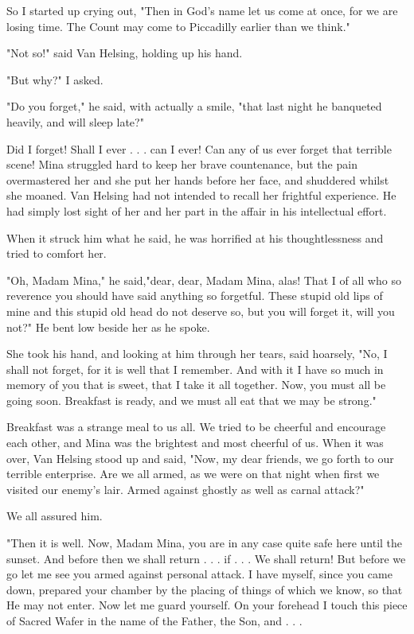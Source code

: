So I started up crying out, "Then in God's name let us come at once, for we are losing time. The Count may come to Piccadilly earlier than we think." 

"Not so!" said Van Helsing, holding up his hand. 

"But why?" I asked. 

"Do you forget," he said, with actually a smile, "that last night he banqueted heavily, and will sleep late?" 

Did I forget! Shall I ever . . . can I ever! Can any of us ever forget that terrible scene! Mina struggled hard to keep her brave countenance, but the pain overmastered her and she put her hands before her face, and shuddered whilst she moaned. Van Helsing had not intended to recall her frightful experience. He had simply lost sight of her and her part in the affair in his intellectual effort. 

When it struck him what he said, he was horrified at his thoughtlessness and tried to comfort her. 

"Oh, Madam Mina," he said,"dear, dear, Madam Mina, alas! That I of all who so reverence you should have said anything so forgetful. These stupid old lips of mine and this stupid old head do not deserve so, but you will forget it, will you not?" He bent low beside her as he spoke. 

She took his hand, and looking at him through her tears, said hoarsely, "No, I shall not forget, for it is well that I remember. And with it I have so much in memory of you that is sweet, that I take it all together. Now, you must all be going soon. Breakfast is ready, and we must all eat that we may be strong." 

Breakfast was a strange meal to us all. We tried to be cheerful and encourage each other, and Mina was the brightest and most cheerful of us. When it was over, Van Helsing stood up and said, "Now, my dear friends, we go forth to our terrible enterprise. Are we all armed, as we were on that night when first we visited our enemy's lair. Armed against ghostly as well as carnal attack?" 

We all assured him. 

"Then it is well. Now, Madam Mina, you are in any case quite safe here until the sunset. And before then we shall return . . . if . . . We shall return! But before we go let me see you armed against personal attack. I have myself, since you came down, prepared your chamber by the placing of things of which we know, so that He may not enter. Now let me guard yourself. On your forehead I touch this piece of Sacred Wafer in the name of the Father, the Son, and . . . 

